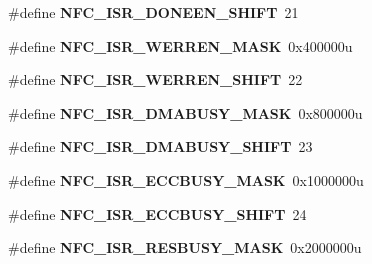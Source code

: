 \begin{DoxyCompactItemize}
\item 
\hypertarget{group___n_f_c___register___masks_ga43ff58bef14673ac7f374029c1077fff}{}\#define {\bfseries N\+F\+C\+\_\+\+I\+S\+R\+\_\+\+D\+O\+N\+E\+E\+N\+\_\+\+S\+H\+I\+F\+T}~21\label{group___n_f_c___register___masks_ga43ff58bef14673ac7f374029c1077fff}

\item 
\hypertarget{group___n_f_c___register___masks_gaf0b9472f75ef14efa01742bc0c80526f}{}\#define {\bfseries N\+F\+C\+\_\+\+I\+S\+R\+\_\+\+W\+E\+R\+R\+E\+N\+\_\+\+M\+A\+S\+K}~0x400000u\label{group___n_f_c___register___masks_gaf0b9472f75ef14efa01742bc0c80526f}

\item 
\hypertarget{group___n_f_c___register___masks_gabc97e0188c14395fc20fad0a16bbb34c}{}\#define {\bfseries N\+F\+C\+\_\+\+I\+S\+R\+\_\+\+W\+E\+R\+R\+E\+N\+\_\+\+S\+H\+I\+F\+T}~22\label{group___n_f_c___register___masks_gabc97e0188c14395fc20fad0a16bbb34c}

\item 
\hypertarget{group___n_f_c___register___masks_gaae783d68898212d7d95fdd4d171104d9}{}\#define {\bfseries N\+F\+C\+\_\+\+I\+S\+R\+\_\+\+D\+M\+A\+B\+U\+S\+Y\+\_\+\+M\+A\+S\+K}~0x800000u\label{group___n_f_c___register___masks_gaae783d68898212d7d95fdd4d171104d9}

\item 
\hypertarget{group___n_f_c___register___masks_gaa819cd73c330d63297462492be7d3703}{}\#define {\bfseries N\+F\+C\+\_\+\+I\+S\+R\+\_\+\+D\+M\+A\+B\+U\+S\+Y\+\_\+\+S\+H\+I\+F\+T}~23\label{group___n_f_c___register___masks_gaa819cd73c330d63297462492be7d3703}

\item 
\hypertarget{group___n_f_c___register___masks_ga5b4ec1f16167ca2f9694c817548978c3}{}\#define {\bfseries N\+F\+C\+\_\+\+I\+S\+R\+\_\+\+E\+C\+C\+B\+U\+S\+Y\+\_\+\+M\+A\+S\+K}~0x1000000u\label{group___n_f_c___register___masks_ga5b4ec1f16167ca2f9694c817548978c3}

\item 
\hypertarget{group___n_f_c___register___masks_ga39fadccb95ba0d39298a24659d75efa5}{}\#define {\bfseries N\+F\+C\+\_\+\+I\+S\+R\+\_\+\+E\+C\+C\+B\+U\+S\+Y\+\_\+\+S\+H\+I\+F\+T}~24\label{group___n_f_c___register___masks_ga39fadccb95ba0d39298a24659d75efa5}

\item 
\hypertarget{group___n_f_c___register___masks_ga189ebe4ebf1568346db684bd91a615d0}{}\#define {\bfseries N\+F\+C\+\_\+\+I\+S\+R\+\_\+\+R\+E\+S\+B\+U\+S\+Y\+\_\+\+M\+A\+S\+K}~0x2000000u\label{group___n_f_c___register___masks_ga189ebe4ebf1568346db684bd91a615d0}


\end{DoxyCompactItemize}
